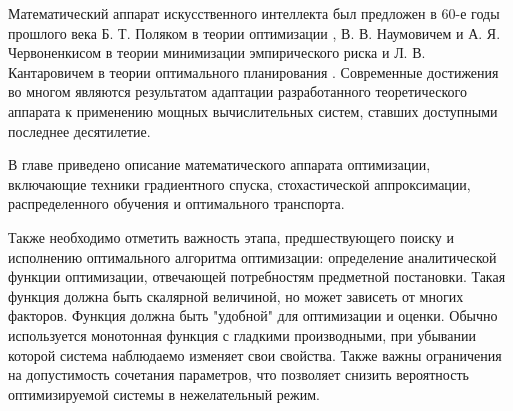 Математический аппарат искусственного интеллекта был предложен в 60-е годы прошлого века
Б. Т. Поляком в теории оптимизации \cite{kantorovich1960mathematical}, 
В. В. Наумовичем и А. Я. Червоненкисом \cite{вапник1974теория} в теории минимизации эмпирического риска
и Л. В. Кантаровичем в теории оптимального планирования \cite{kantorovich1960mathematical}.
Современные достижения во многом являются результатом адаптации разработанного теоретического аппарата к применению 
мощных вычислительных систем, ставших доступными последнее десятилетие.

В главе приведено описание математического аппарата оптимизации, включающие техники
градиентного спуска, стохастической аппроксимации, распределенного обучения и оптимального транспорта.

Также необходимо отметить важность этапа, предшествующего поиску и исполнению оптимального алгоритма оптимизации:
определение аналитической функции оптимизации, отвечающей потребностям предметной постановки. 
Такая функция должна быть скалярной величиной, но может зависеть от многих факторов. Функция должна быть "удобной" для 
оптимизации и оценки. Обычно используется монотонная функция с гладкими производными, при убывании которой 
система наблюдаемо изменяет свои свойства. Также важны ограничения на допустимость сочетания параметров, что 
позволяет снизить вероятность оптимизируемой системы в нежелательный режим.
